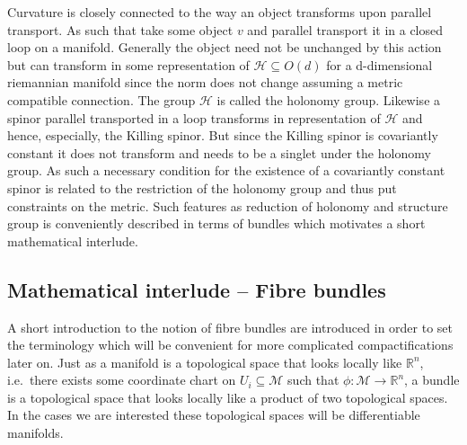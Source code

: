 Curvature is closely connected to the way an object transforms upon parallel transport. As such that take some object $v$ and parallel transport it in a closed loop on a manifold. Generally the object need not be unchanged by this action but can transform in some representation of $\mathcal{H}\subseteq O(d)$ for a d-dimensional riemannian manifold since the norm does not change assuming a metric compatible connection. The group $\mathcal{H}$ is called the holonomy group. Likewise a spinor parallel transported in a loop transforms in representation of $\mathcal{H}$ and hence, especially, the Killing spinor. But since the Killing spinor is covariantly constant it does not transform and needs to be a singlet under the holonomy group. As such a necessary condition for the existence of a covariantly constant spinor is related to the restriction of the holonomy group and thus put constraints on the metric. Such features as reduction of holonomy and structure group is conveniently described in terms of bundles which motivates a short mathematical interlude.

\subsection{Mathematical interlude -- Fibre bundles}
A short introduction to the notion of fibre bundles are introduced in order to set the terminology which will be convenient for more complicated compactifications later on. Just as a manifold is a topological space that looks locally like $\mathbb{R}^n$, i.e.\ there exists some coordinate chart on $U_i\subseteq \mathcal{M}$ such that $\phi: \mathcal{M}\to \mathbb{R}^n$, a bundle is a topological space that looks locally like a product of two topological spaces. In the cases we are interested these topological spaces will be differentiable manifolds. 

